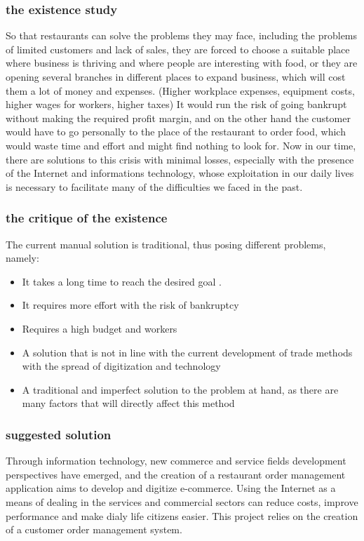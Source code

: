 \documentclass{article}
\begin{document}
\subsubsection{the existence study}
So that restaurants can solve the problems they may face, including the problems of limited customers and lack of sales, they are forced to choose a suitable place where business is thriving and where people are interesting with food, or they are opening several branches in different places to expand business, which will cost them a lot of money and expenses. (Higher workplace expenses, equipment costs, higher wages for workers, higher taxes) It would run the risk of going bankrupt without making the required profit margin, and on the other hand the customer would have to go personally to the place of the restaurant to order food, which would waste time and effort and might find nothing to look for.  Now in our time, there are solutions to this crisis with minimal losses, especially with the presence of the Internet and informations technology, whose exploitation in our daily lives is necessary to facilitate many of the difficulties we faced in the past.
\subsubsection{the critique of the existence}
The current manual solution is traditional, thus posing different problems, namely: 
\begin{itemize}
\item It takes a long time to reach the desired goal .
\item It requires more effort with the risk of bankruptcy 
\item Requires a high budget and workers 
\item A solution that is not in line with the current development of trade methods with the spread of digitization and technology 
\item A traditional and imperfect solution to the problem at hand, as there are many factors that will directly affect this method 
\end{itemize}

\subsubsection{suggested solution}
Through information technology, new commerce and service fields development perspectives have emerged, and the creation of a restaurant order management application aims to develop and digitize e-commerce. Using the Internet as a means of dealing in the services and commercial sectors can reduce costs, improve performance and make dialy life citizens easier.
This project relies on the creation of a customer order management system.
\end{document}
